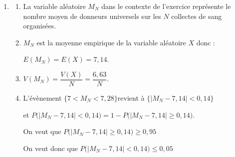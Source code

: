 \documentclass[10pt]{article}
\providecommand{\np}[2][]{{#2~#1}}
\begin{document}
\begin{enumerate}
\begin{enumerate}
La variable aléatoire $X$ compte le nombre de succès.

Donc $X$ suit une loi binomiale de paramètres $n=100$ et $p=\np{0,0714}$.
		\item $P(X \leq 7 ) \approx \np{0,57714}$.

À $10^{-3}$ près, la probabilité  qu'il y ait au plus 7 donneurs universels dans cet échantillon vaut $0,577$.
		\item  $X$ suit une loi binomiale de paramètres $n=100$ et $p=\np{0,0714}$ donc :

$\begin{aligned}[t] E(X)& =n \times p \\&= 100 \times 0,0714\\&=7,14\end{aligned}$
	\hfill~
$\begin{aligned}[t] V(X)& = n \times p \times (1-p)\\& = 100 \times 0,0714 \times (1- 0,714) \\& = \np{6,630204}\\
	& 	\approx 6,63\quad\text{ à }10^{-2} \text{ près.}
\end{aligned}$
\hfill~
	\end{enumerate}
\item
	
	
	
	
	
	\begin{enumerate}
		\item  La variable aléatoire $M_{N}$ dans le contexte de l'exercice représente le nombre moyen de donneurs universels sur les $N$ collectes de sang organisées.

		\item  $M_N$ est la moyenne empirique de la variable aléatoire $X$ donc :
		
$E\left(M_{N}\right)=E(X) =7,14$.
		\item

$V\left(M_{N}\right)=\dfrac{V(X)}{N}= \dfrac{6,63}{N}$.
		\item L'évènement \quad $\big\{ 7<M_{N}<7,28 \big\}$\quad revient à \quad $\big\{\big|M_{N} - 7,14\big| < 0,14\big\}$

et \quad $P\Big(\big|M_N - 7,14 \big| < 0,14\Big) = 1 - P\Big(\big|M_{N} - 7,14 \big| \geqslant 0,14\Big)$.

On veut que $P\Big(\big|M_{N} - 7,14 \big| \geqslant 0,14\Big) \geqslant 0,95$

On veut donc que $P\Big(\big|M_N - 7,14 \big| < 0,14\Big) \leqslant 0,05$


\end{enumerate}
\end{enumerate}
\end{document}
